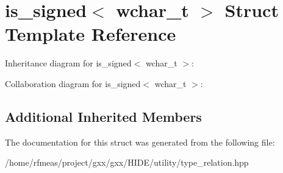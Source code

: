 \hypertarget{structis__signed_3_01wchar__t_01_4}{}\section{is\+\_\+signed$<$ wchar\+\_\+t $>$ Struct Template Reference}
\label{structis__signed_3_01wchar__t_01_4}


Inheritance diagram for is\+\_\+signed$<$ wchar\+\_\+t $>$\+:


Collaboration diagram for is\+\_\+signed$<$ wchar\+\_\+t $>$\+:
\subsection*{Additional Inherited Members}


The documentation for this struct was generated from the following file\+:\begin{DoxyCompactItemize}
\item 
/home/rfmeas/project/gxx/gxx/\+H\+I\+D\+E/utility/type\+\_\+relation.\+hpp\end{DoxyCompactItemize}
